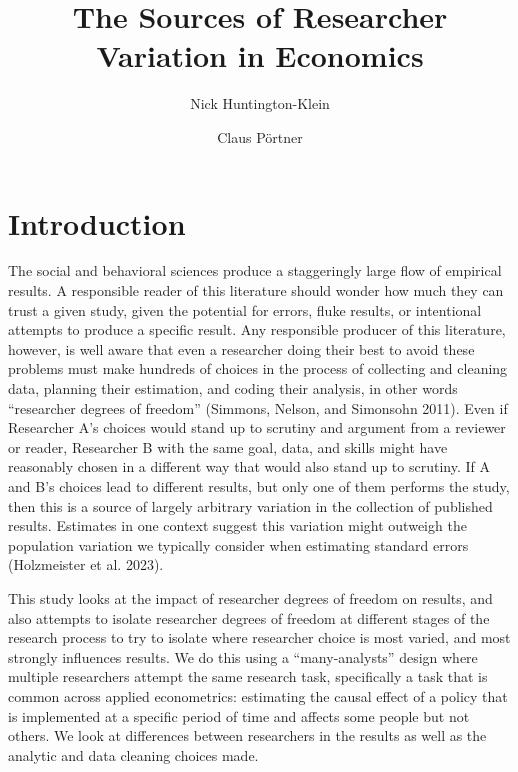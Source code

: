 \documentclass[
  letterpaper,
  DIV=11,
  numbers=noendperiod]{scrartcl}
\title{The Sources of Researcher Variation in Economics}
\author{Nick Huntington-Klein \and Claus Pörtner}
\date{}
\begin{document}
\maketitle
\ifdefined\Shaded\renewenvironment{Shaded}{\begin{tcolorbox}[sharp corners, frame hidden, breakable, boxrule=0pt, enhanced, interior hidden, borderline west={3pt}{0pt}{shadecolor}]}{\end{tcolorbox}}\fi

\hypertarget{introduction}{%
\section{Introduction}\label{introduction}}

The social and behavioral sciences produce a staggeringly large flow of
empirical results. A responsible reader of this literature should wonder
how much they can trust a given study, given the potential for errors,
fluke results, or intentional attempts to produce a specific result. Any
responsible producer of this literature, however, is well aware that
even a researcher doing their best to avoid these problems must make
hundreds of choices in the process of collecting and cleaning data,
planning their estimation, and coding their analysis, in other words
``researcher degrees of freedom'' (Simmons, Nelson, and Simonsohn 2011).
Even if Researcher A's choices would stand up to scrutiny and argument
from a reviewer or reader, Researcher B with the same goal, data, and
skills might have reasonably chosen in a different way that would also
stand up to scrutiny. If A and B's choices lead to different results,
but only one of them performs the study, then this is a source of
largely arbitrary variation in the collection of published results.
Estimates in one context suggest this variation might outweigh the
population variation we typically consider when estimating standard
errors (Holzmeister et al. 2023).

This study looks at the impact of researcher degrees of freedom on
results, and also attempts to isolate researcher degrees of freedom at
different stages of the research process to try to isolate where
researcher choice is most varied, and most strongly influences results.
We do this using a ``many-analysts'' design where multiple researchers
attempt the same research task, specifically a task that is common
across applied econometrics: estimating the causal effect of a policy
that is implemented at a specific period of time and affects some people
but not others. We look at differences between researchers in the
results as well as the analytic and data cleaning choices made.
\end{document}
